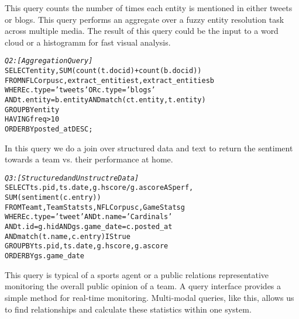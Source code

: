 This query counts the number of times each entity is mentioned in either tweets
or blogs. This query performs an aggregate over a fuzzy entity resolution
task across multiple media. The result of this query could be the input to a
word cloud or a histogramm for fast visual analysis.
\begin{small}
\begin{alltt}
\textit{Q2: [Aggregation Query]}
SELECT entity, SUM(count(t.docid) + count(b.docid))
FROM NFLCorpus c, extract_entities t, extract_entities b
WHERE c.type = 'tweets' OR c.type = 'blogs' 
  AND t.entity = b.entity AND match(ct.entity, t.entity)
GROUP BY entity
HAVING freq > 10
ORDER BY posted_at DESC;
\end{alltt}
\end{small}

In this query we do a join over structured data and text to return the
sentiment towards a team vs. their performance at home. 
\begin{small}
\begin{alltt}
\textit{Q3: [Structured and Unstructre Data]}
SELECT ts.pid, ts.date, g.hscore / g.ascore AS perf,
  SUM(sentiment(c.entry))
FROM Team t, TeamStats ts, NFLCorpus c, GameStats g
WHERE c.type = 'tweet' AND t.name = 'Cardinals' 
  AND t.id = g.hid AND gs.game_date = c.posted_at 
  AND match(t.name,c.entry) IS true
GROUP BY ts.pid, ts.date, g.hscore, g.ascore
ORDER BY gs.game_date
\end{alltt}
\end{small}


This query is typical of a sports agent or a public relations representative
monitoring the overall public opinion of a team. A query interface provides a
simple method for real-time monitoring. 
Multi-modal queries, like this, allows us to find relationships and calculate
these statistics within one system. 



